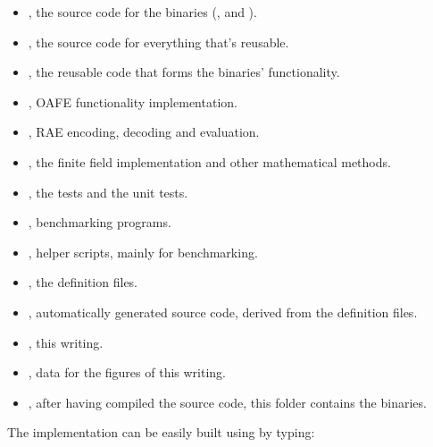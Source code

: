 \begin{itemize}

  \item {}, the source code for the binaries (\JWBpOne{},
    \JWBpTwo{} and \JWBtoken{}).

  \item {}, the source code for everything that's reusable.

  \item {}, the reusable code that forms the binaries'
    functionality.

  \item {}, OAFE functionality implementation.

  \item {}, RAE encoding, decoding and evaluation.

  \item {}, the finite field implementation and other
    mathematical methods.

  \item {}, the \JWTquickcheck{} tests and the unit tests.

  \item {}, benchmarking programs.

  \item {}, helper scripts, mainly for benchmarking.

  \item {}, the \JWTXprotobuf{} definition files.

  \item {}, automatically generated source code, derived from the
    \JWTprotobuf{} definition files.

  \item {}, this writing.

  \item {}, data for the figures of this writing.

  \item {}, after having compiled the source code, this folder
    contains the binaries.

\end{itemize}



The implementation can be easily built using \JWTLcabal{} by typing:

